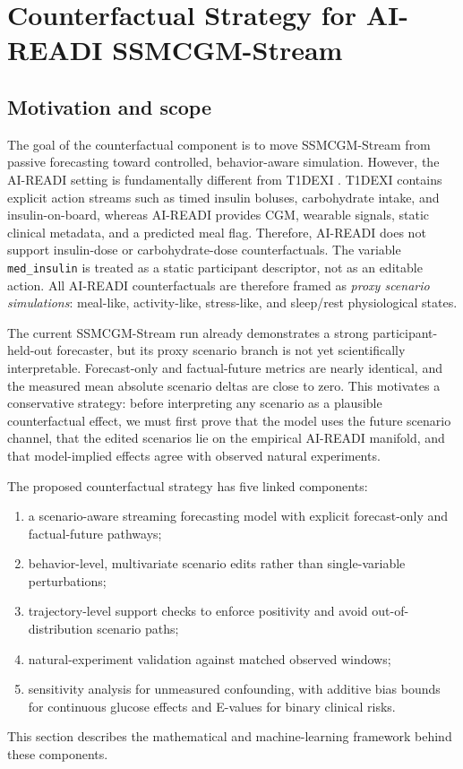 \section{Counterfactual Strategy for AI-READI SSMCGM-Stream}
\label{sec:aireadi_counterfactual_strategy}

\subsection{Motivation and scope}
\label{subsec:cf_motivation_scope}

The goal of the counterfactual component is to move SSMCGM-Stream from passive forecasting toward controlled, behavior-aware simulation. However, the AI-READI setting is fundamentally different from T1DEXI \citep{riddell2023t1dexi,aireadi2024}. T1DEXI contains explicit action streams such as timed insulin boluses, carbohydrate intake, and insulin-on-board, whereas AI-READI provides CGM, wearable signals, static clinical metadata, and a predicted meal flag. Therefore, AI-READI does not support insulin-dose or carbohydrate-dose counterfactuals. The variable \texttt{med\_insulin} is treated as a static participant descriptor, not as an editable action. All AI-READI counterfactuals are therefore framed as \emph{proxy scenario simulations}: meal-like, activity-like, stress-like, and sleep/rest physiological states.

The current SSMCGM-Stream run already demonstrates a strong participant-held-out forecaster, but its proxy scenario branch is not yet scientifically interpretable. Forecast-only and factual-future metrics are nearly identical, and the measured mean absolute scenario deltas are close to zero. This motivates a conservative strategy: before interpreting any scenario as a plausible counterfactual effect, we must first prove that the model uses the future scenario channel, that the edited scenarios lie on the empirical AI-READI manifold, and that model-implied effects agree with observed natural experiments.

The proposed counterfactual strategy has five linked components:
\begin{enumerate}
    \item a scenario-aware streaming forecasting model with explicit forecast-only and factual-future pathways;
    \item behavior-level, multivariate scenario edits rather than single-variable perturbations;
    \item trajectory-level support checks to enforce positivity and avoid out-of-distribution scenario paths;
    \item natural-experiment validation against matched observed windows;
    \item sensitivity analysis for unmeasured confounding, with additive bias bounds for continuous glucose effects and E-values for binary clinical risks.
\end{enumerate}
This section describes the mathematical and machine-learning framework behind these components.

